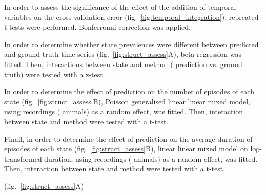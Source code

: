 In order to assess the significance of the effect of the addition of temporal variables on the cross-validation
error (fig.~\ref{fig:temporal_integration}), repreated t-tests were performed.
Bonferronni correction was applied.

In order to determine whether state prevalences were different between predicted and ground truth time series (fig.~\ref{fig:struct_assess}A),
beta regression \citationneeded{} was fitted. 
Then, interactions between state and method (\ie{} prediction vs. ground truth) were tested with a z-test.

In order to determine the effect of prediction on the number of episodes of each state (fig.~\ref{fig:struct_assess}B),
Poisson generalised linear linear mixed model\citationneeded{}, using recordings (\ie{} animals) as a random effect, was fitted. 
Then, interaction between state and method were tested with a t-test.

Finall, in order to determine the effect of prediction on the average duration of episodes of each state (fig.~\ref{fig:struct_assess}B),
linear linear mixed model\citationneeded{} on log-transformed duration, using recordings (\ie{} animals) as a random effect, was fitted. 
Then, interaction between state and method were tested with a t-test.

(fig.~\ref{fig:struct_assess}A)



